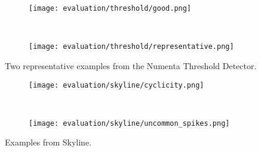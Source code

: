\begin{figure}[htp!]
    \begin{subfigure}[b]{\linewidth}
        \centering
        \texttt{[image: evaluation/threshold/good.png]}
    \end{subfigure}%
    \\
    \begin{subfigure}[b]{\linewidth}
        \centering
        \texttt{[image: evaluation/threshold/representative.png]}
    \end{subfigure}
\caption[Examples from Numenta Threshold Detector.]{Two representative examples
from the Numenta Threshold Detector.}\label{fig:threshold-output}
\end{figure}

\begin{figure}[htp!]
    \begin{subfigure}[b]{\linewidth}
        \centering
        \texttt{[image: evaluation/skyline/cyclicity.png]}
        \label{fig:skyline-cyclicity}
    \end{subfigure}%
    \\
    \begin{subfigure}[b]{\linewidth}
        \centering
        \texttt{[image: evaluation/skyline/uncommon\_spikes.png]}
        \label{fig:skyline-fp}
    \end{subfigure}
\caption{Examples from Skyline.}\label{fig:skyline-output}
\end{figure}


